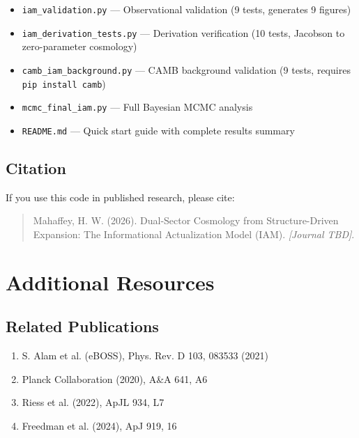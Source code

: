 \documentclass[11pt]{article}
\begin{document}
\begin{itemize}
    \item \texttt{iam\_validation.py} --- Observational validation (9 tests, generates 9 figures)
    \item \texttt{iam\_derivation\_tests.py} --- Derivation verification (10 tests, Jacobson to zero-parameter cosmology)
    \item \texttt{camb\_iam\_background.py} --- CAMB background validation (9 tests, requires \texttt{pip install camb})
    \item \texttt{mcmc\_final\_iam.py} --- Full Bayesian MCMC analysis
    \item \texttt{README.md} --- Quick start guide with complete results summary
\end{itemize}

\subsection{Citation}

If you use this code in published research, please cite:

\begin{quote}
Mahaffey, H. W. (2026). Dual-Sector Cosmology from Structure-Driven Expansion: The Informational Actualization Model (IAM). \textit{[Journal TBD]}.
\end{quote}

\section{Additional Resources}

\subsection{Related Publications}

\begin{enumerate}
    \item S. Alam et al. (eBOSS), Phys. Rev. D 103, 083533 (2021)
    \item Planck Collaboration (2020), A\&A 641, A6
    \item Riess et al. (2022), ApJL 934, L7
    \item Freedman et al. (2024), ApJ 919, 16
\end{enumerate}
\end{document}
